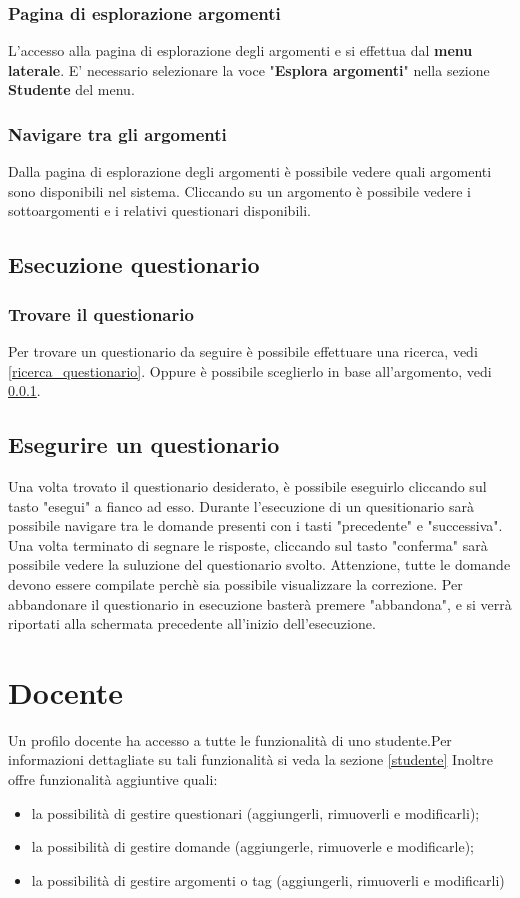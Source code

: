 \documentclass[12pt,a4paper]{article}
\begin{document}
	\subsubsection{Pagina di esplorazione argomenti} \label{esplorazione_arg}
	L'accesso alla pagina di esplorazione degli argomenti e si effettua dal \textbf{menu laterale}. 
	E' necessario selezionare la voce "\textbf{Esplora argomenti}" nella sezione \textbf{Studente} del menu.
	\subsubsection{Navigare tra gli argomenti}
	Dalla pagina di esplorazione degli argomenti è possibile vedere quali argomenti sono disponibili nel sistema. Cliccando su un argomento è possibile vedere i sottoargomenti e i relativi questionari disponibili.
	
	\subsection{Esecuzione questionario}
	\subsubsection{Trovare il questionario}
		Per trovare un questionario da seguire è possibile effettuare una ricerca, vedi \ref{ricerca_questionario}.
		Oppure è possibile sceglierlo in base all'argomento, vedi \ref{esplorazione_arg}.
	\subsection{Esegurire un questionario}
	Una  volta trovato il questionario desiderato, è possibile eseguirlo cliccando sul tasto "esegui" a fianco ad esso.
	Durante l'esecuzione di un quesitionario sarà possibile navigare tra le domande presenti con i tasti "precedente" e "successiva".
	Una volta terminato di segnare le risposte, cliccando sul tasto "conferma" sarà possibile vedere la suluzione del questionario svolto.
	Attenzione, tutte le domande devono essere compilate perchè sia possibile visualizzare la correzione.
	Per abbandonare il questionario in esecuzione basterà premere "abbandona", e si verrà riportati alla schermata precedente all'inizio dell'esecuzione.
	
	\section{Docente}\label{docente}
	Un profilo docente ha accesso a tutte le funzionalità di uno studente.Per informazioni dettagliate su tali funzionalità si veda la sezione \ref{studente}
		Inoltre offre funzionalità aggiuntive quali:
		\begin{itemize}
			\item la possibilità di gestire questionari (aggiungerli, rimuoverli e modificarli);
			\item la possibilità di gestire domande (aggiungerle, rimuoverle e modificarle);
			\item la possibilità di gestire argomenti o tag (aggiungerli, rimuoverli e modificarli)
		\end{itemize}
\end{document}
